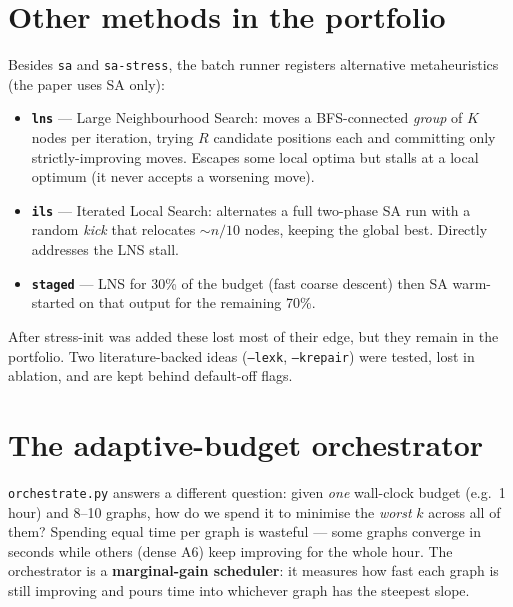 \documentclass[11pt]{article}
\newcommand{\code}[1]{\colorbox{codebg}{\texttt{\small #1}}}
\begin{document}
\section{Other methods in the portfolio}
Besides \texttt{sa} and \texttt{sa-stress}, the batch runner registers alternative
metaheuristics (the paper uses SA only):
\begin{itemize}[leftmargin=1.3em,itemsep=1pt]
  \item \textbf{\texttt{lns}} --- Large Neighbourhood Search: moves a BFS-connected
  \emph{group} of $K$ nodes per iteration, trying $R$ candidate positions each and
  committing only strictly-improving moves. Escapes some local optima but stalls at a
  local optimum (it never accepts a worsening move).
  \item \textbf{\texttt{ils}} --- Iterated Local Search: alternates a full two-phase SA
  run with a random \emph{kick} that relocates $\sim n/10$ nodes, keeping the global
  best. Directly addresses the LNS stall.
  \item \textbf{\texttt{staged}} --- LNS for 30\% of the budget (fast coarse descent)
  then SA warm-started on that output for the remaining 70\%.
\end{itemize}
After stress-init was added these lost most of their edge, but they remain in the
portfolio. Two literature-backed ideas (\code{--lexk}, \code{--krepair}) were tested,
lost in ablation, and are kept behind default-off flags.

\section{The adaptive-budget orchestrator}
\code{orchestrate.py} answers a different question: given \emph{one} wall-clock budget
(e.g.\ 1 hour) and 8--10 graphs, how do we spend it to minimise the \emph{worst} $k$
across all of them? Spending equal time per graph is wasteful --- some graphs converge in
seconds while others (dense A6) keep improving for the whole hour. The orchestrator is a
\textbf{marginal-gain scheduler}: it measures how fast each graph is still improving and
pours time into whichever graph has the steepest slope.
\end{document}
